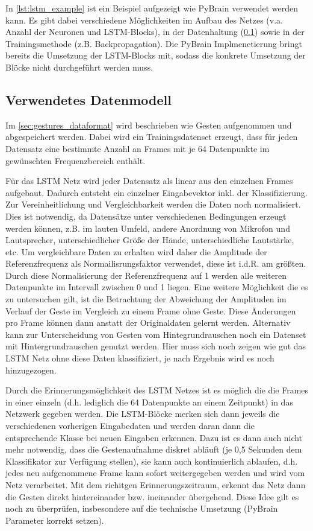 \clearpage
 
In \autoref{lst:lstm_example} ist ein Beispiel aufgezeigt wie \ac{PyBrain}
verwendet werden kann. Es gibt dabei verschiedene Möglichkeiten im Aufbau des
Netzes (v.a. Anzahl der Neuronen und \ac{LSTM}-Blocks), in der Datenhaltung
(\ref{sec:lstm_data}) sowie in der Trainingsmethode (z.B. Backpropagation).
Die \ac{PyBrain} Implmenetierung bringt bereits die Umsetzung der
\ac{LSTM}-Blocks mit, sodass die konkrete Umsetzung der Blöcke nicht
durchgeführt werden muss.

\subsection{Verwendetes Datenmodell}
\label{sec:lstm_data}

Im \autoref{sec:gestures_dataformat} wird beschrieben wie Gesten aufgenommen und
abgespeichert werden. Dabei wird ein Trainingsdatenset erzeugt, dass für
jeden Datensatz eine bestimmte Anzahl an Frames mit je 64 Datenpunkte im
gewünschten Frequenzbereich enthält. 

Für das \ac{LSTM} Netz wird jeder Datensatz als linear aus den einzelnen Frames
aufgebaut. Dadurch entsteht ein einzelner Eingabevektor inkl. der
Klassifizierung. Zur Vereinheitlichung und Vergleichbarkeit werden die Daten
noch normalisiert.
Dies ist notwendig, da Datensätze unter verschiedenen Bedingungen erzeugt werden
können, z.B. im lauten Umfeld, andere Anordnung von Mikrofon und Lautsprecher,
unterschiedlicher Größe der Hände, unterschiedliche Lautstärke, etc. Um
vergleichbare Daten zu erhalten wird daher die Amplitude der Referenzfrequenz
als Normailisrungsfaktor verwendet, diese ist i.d.R. am größten. Durch diese
Normalisierung der Referenzfrequenz auf 1 werden alle weiteren Datenpunkte im
Intervall zwischen 0 und 1 liegen. Eine weitere Möglichkeit die es zu
untersuchen gilt, ist die Betrachtung der Abweichung der Amplituden im Verlauf
der Geste im Vergleich zu einem Frame ohne Geste. Diese Änderungen pro Frame
können dann anstatt der Originaldaten gelernt werden. Alternativ kann zur
Unterscheidung von Gesten vom Hintegrundrauschen noch ein Datenset mit
Hintergrundrauschen genutzt werden. Hier muss sich noch zeigen wie gut das
\ac{LSTM} Netz ohne diese Daten klassifiziert, je nach Ergebnis wird es noch
hinzugezogen. 

Durch die Erinnerungsmöglichkeit des \ac{LSTM} Netzes ist es möglich die die
Frames in einer einzeln (d.h. lediglich die 64 Datenpunkte an einem Zeitpunkt)
in das Netzwerk gegeben werden. Die \ac{LSTM}-Blöcke merken sich dann jeweils
die verschiedenen vorherigen Eingabedaten und werden daran dann die
entsprechende Klasse bei neuen Eingaben erkennen. Dazu ist es dann auch nicht
mehr notwendig, dass die Gestenaufnahme diskret abläuft (je 0,5 Sekunden dem
Klassifikator zur Verfügung stellen), sie kann auch kontinuierlich ablaufen,
d.h. jedes neu aufgenommene Frame kann sofort weitergegeben werden und wird vom
Netz verarbeitet. Mit dem richitgen Erinnerungszeitraum, erkennt das Netz dann
die Gesten direkt hintereinander bzw. ineinander übergehend. Diese Idee gilt es
noch zu überprüfen, insbesondere auf die technische Umsetzung (PyBrain
Parameter korrekt setzen).




\nocite{GERS2001,WIKI2013,Schmidhuber2013,LSTM1,Nerbonne1}
